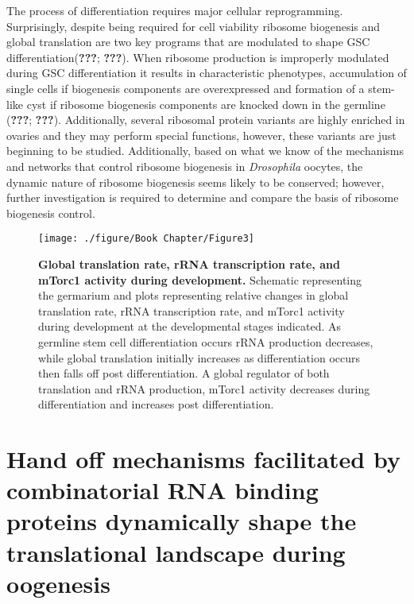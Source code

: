 \documentclass[12pt,oneside]{reedthesis}
\begin{document}
The process of differentiation requires major cellular reprogramming.
Surprisingly, despite being required for cell viability ribosome
biogenesis and global translation are two key programs that are
modulated to shape GSC differentiation({\textbf{???}}; {\textbf{???}}).
When ribosome production is improperly modulated during GSC
differentiation it results in characteristic phenotypes, accumulation of
single cells if biogenesis components are overexpressed and formation of
a stem-like cyst if ribosome biogenesis components are knocked down in
the germline ({\textbf{???}}; {\textbf{???}}). Additionally, several
ribosomal protein variants are highly enriched in ovaries and they may
perform special functions, however, these variants are just beginning to
be studied. Additionally, based on what we know of the mechanisms and
networks that control ribosome biogenesis in \emph{Drosophila} oocytes, the
dynamic nature of ribosome biogenesis seems likely to be conserved;
however, further investigation is required to determine and compare the
basis of ribosome biogenesis control.
\begin{figure}

{\centering \texttt{[image: ./figure/Book Chapter/Figure3]} 

}

\caption[\textbf{Global translation rate, rRNA transcription rate, and mTorc1 activity during development.}]{\textbf{Global translation rate, rRNA transcription rate, and mTorc1 activity during development.} Schematic representing the germarium and plots representing relative changes in global translation rate, rRNA transcription rate, and mTorc1 activity during development at the developmental stages indicated. As germline stem cell differentiation occurs rRNA production decreases, while global translation initially increases as differentiation occurs then falls off post differentiation. A global regulator of both translation and rRNA production, mTorc1 activity decreases during differentiation and increases post differentiation.}\label{fig:unnamed-chunk-4}
\end{figure}
\hypertarget{hand-off-mechanisms-facilitated-by-combinatorial-rna-binding-proteins-dynamically-shape-the-translational-landscape-during-oogenesis}{%
\section{Hand off mechanisms facilitated by combinatorial RNA binding proteins dynamically shape the translational landscape during oogenesis}\label{hand-off-mechanisms-facilitated-by-combinatorial-rna-binding-proteins-dynamically-shape-the-translational-landscape-during-oogenesis}}
\end{document}
